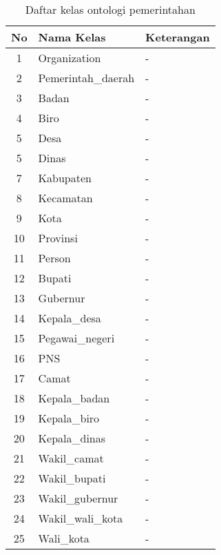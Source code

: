 \begin{table}[hb]
	\caption{Daftar kelas ontologi pemerintahan}
	\label{table:ontogov_class}
	\begin{tabularx}{\textwidth}{|c|X|X|}
		\hline
		No & Nama Kelas & Keterangan \\
		\hline
		1 & Organization & - \\
		\hline
		2 & Pemerintah\_daerah & - \\
		\hline
		3 & Badan & - \\
		\hline
		4 & Biro & - \\
		\hline
		5 & Desa & - \\
		\hline
		5 & Dinas & - \\
		\hline
		7 & Kabupaten & - \\
		\hline
		8 & Kecamatan & - \\
		\hline
		9 & Kota & - \\
		\hline
		10 & Provinsi & - \\
		\hline
		11 & Person & - \\
		\hline
		12 & Bupati & - \\
		\hline
		13 & Gubernur & - \\
		\hline
		14 & Kepala\_desa & - \\
		\hline
		15 & Pegawai\_negeri & - \\
		\hline
		16 & PNS & - \\
		\hline
		17 & Camat & - \\
		\hline
		18 & Kepala\_badan & - \\
		\hline
		19 & Kepala\_biro & - \\
		\hline
		20 & Kepala\_dinas & - \\
		\hline
		21 & Wakil\_camat & - \\
		\hline
		22 & Wakil\_bupati & - \\
		\hline
		23 & Wakil\_gubernur & - \\
		\hline
		24 & Wakil\_wali\_kota & - \\
		\hline
		25 & Wali\_kota & - \\
		\hline
	\end{tabularx}
\end{table}